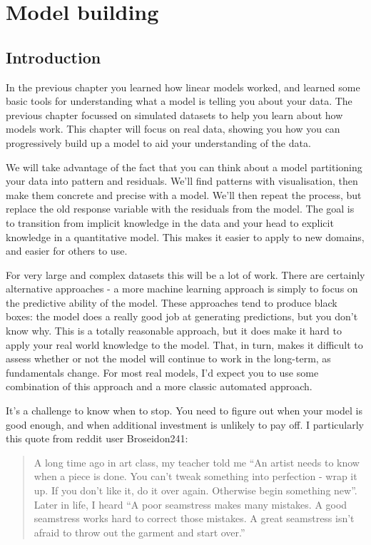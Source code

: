\documentclass[]{book}
\begin{document}
\hypertarget{model-building}{\chapter{Model
building}\label{model-building}}

\section{Introduction}\label{introduction-16}

In the previous chapter you learned how linear models worked, and
learned some basic tools for understanding what a model is telling you
about your data. The previous chapter focussed on simulated datasets to
help you learn about how models work. This chapter will focus on real
data, showing you how you can progressively build up a model to aid your
understanding of the data.

We will take advantage of the fact that you can think about a model
partitioning your data into pattern and residuals. We'll find patterns
with visualisation, then make them concrete and precise with a model.
We'll then repeat the process, but replace the old response variable
with the residuals from the model. The goal is to transition from
implicit knowledge in the data and your head to explicit knowledge in a
quantitative model. This makes it easier to apply to new domains, and
easier for others to use.

For very large and complex datasets this will be a lot of work. There
are certainly alternative approaches - a more machine learning approach
is simply to focus on the predictive ability of the model. These
approaches tend to produce black boxes: the model does a really good job
at generating predictions, but you don't know why. This is a totally
reasonable approach, but it does make it hard to apply your real world
knowledge to the model. That, in turn, makes it difficult to assess
whether or not the model will continue to work in the long-term, as
fundamentals change. For most real models, I'd expect you to use some
combination of this approach and a more classic automated approach.

It's a challenge to know when to stop. You need to figure out when your
model is good enough, and when additional investment is unlikely to pay
off. I particularly this quote from reddit user Broseidon241:

\begin{quote}
A long time ago in art class, my teacher told me ``An artist needs to
know when a piece is done. You can't tweak something into perfection -
wrap it up. If you don't like it, do it over again. Otherwise begin
something new''. Later in life, I heard ``A poor seamstress makes many
mistakes. A good seamstress works hard to correct those mistakes. A
great seamstress isn't afraid to throw out the garment and start over.''
\end{quote}
\end{document}
